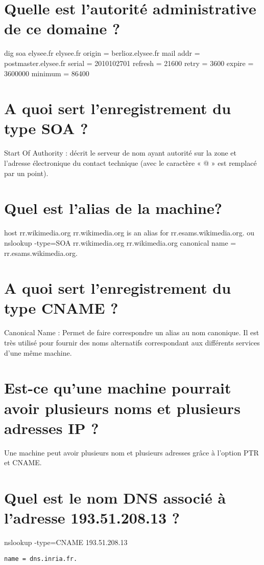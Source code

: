 \section{Quelle est l'autorité administrative de ce domaine ?}
 dig soa elysee.fr\newline
elysee.fr 
	origin = berlioz.elysee.fr 
	mail addr = postmaster.elysee.fr 
	serial = 2010102701 
	refresh = 21600 
	retry = 3600 
	expire = 3600000 
	minimum = 86400 	

\section{A quoi sert l'enregistrement du type SOA ?}
Start Of Authority : décrit le serveur de nom ayant autorité sur la zone et l'adresse électronique du contact technique (avec le caractère « @ » est remplacé par un point). 

\section{Quel est l'alias de la machine?}
host rr.wikimedia.org \newline
rr.wikimedia.org is an alias for rr.esams.wikimedia.org.
ou
nslookup -type=SOA  rr.wikimedia.org
rr.wikimedia.org	canonical name = rr.esams.wikimedia.org. 

\section{A quoi sert l'enregistrement du type CNAME ?}
Canonical Name : Permet de faire correspondre un alias au nom canonique. Il est très utilisé  pour fournir des noms alternatifs correspondant aux différents services d'une même machine.

\section{Est-ce qu'une machine pourrait avoir plusieurs noms et plusieurs adresses IP ?}

Une machine peut avoir plusieurs nom et plusieurs adresses grâce à l'option PTR et CNAME.


\section{Quel est le nom DNS associé à l'adresse 193.51.208.13 ?}
nslookup -type=CNAME 193.51.208.13\newline
\begin{verbatim}
name = dns.inria.fr. 
\end{verbatim}


